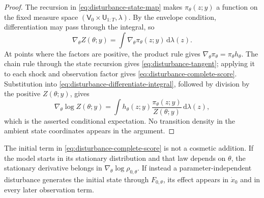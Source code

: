 \documentclass[11pt]{article}
\newcommand{\dd}{\mathrm{d}}
\begin{document}
\begin{proof}
The recursion in \eqref{eq:disturbance-state-map} makes
$\pi_\theta(z;y)$ a function on the fixed measure space
$(\mathsf V_0\times\mathsf U_{1:T},\lambda)$. By the envelope condition,
differentiation may pass through the integral, so
\begin{equation}
 \nabla_\theta Z(\theta;y)=\int \nabla_\theta\pi_\theta(z;y)\,\dd\lambda(z).
 \label{eq:disturbance-differentiate-integral}
\end{equation}
At points where the factors are positive, the product rule gives
$\nabla_\theta\pi_\theta=\pi_\theta h_\theta$. The chain rule through the
state recursion gives \eqref{eq:disturbance-tangent}; applying it to each
shock and observation factor gives \eqref{eq:disturbance-complete-score}.
Substitution into \eqref{eq:disturbance-differentiate-integral}, followed by
division by the positive $Z(\theta;y)$, gives
\begin{equation}
 \nabla_\theta\log Z(\theta;y)
 =\int h_\theta(z;y)\frac{\pi_\theta(z;y)}{Z(\theta;y)}\,\dd\lambda(z),
\end{equation}
which is the asserted conditional expectation. No transition density in the
ambient state coordinates appears in the argument.
\end{proof}

The initial term in \eqref{eq:disturbance-complete-score} is not a cosmetic
addition. If the model starts in its stationary distribution and that law
depends on $\theta$, the stationary derivative belongs in
$\nabla_\theta\log\rho_{0,\theta}$. If instead a parameter-independent
disturbance generates the initial state through $F_{0,\theta}$, its effect
appears in $\dot x_0$ and in every later observation term.
\end{document}
